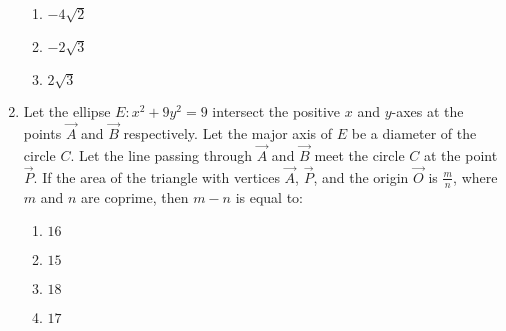 \documentclass[journal]{IEEEtran}
\begin{document}
\begin{enumerate}[start=16]
\begin{enumerate}
    \item $-4\sqrt{2}$
    \item $-2\sqrt{3}$
    \item $2\sqrt{3}$
\end{enumerate}
\item Let the ellipse $E: x^2 + 9y^2 = 9$ intersect the positive $x$ and $y$-axes at the points $\vec{A}$ and $\vec{B}$ respectively. Let the major axis of $E$ be a diameter of the circle $C$. Let the line passing through $\vec{A}$ and $\vec{B}$ meet the circle $C$ at the point $\vec{P}$. If the area of the triangle with vertices $\vec{A}$, $\vec{P}$, and the origin $\vec{O}$ is $\frac{m}{n}$, where $m$ and $n$ are coprime, then $m - n$ is equal to:
\begin{enumerate}
    \item $16$
    \item $15$
    \item $18$
    \item $17$
\end{enumerate}


\end{enumerate}
\end{document}

